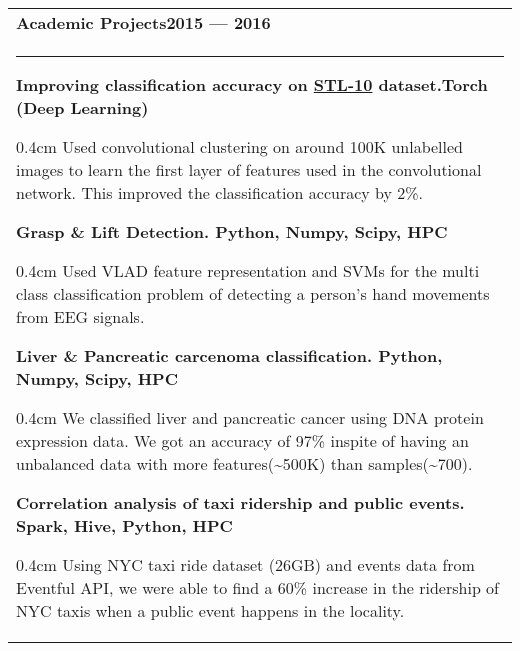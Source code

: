 \documentclass{article}
\newenvironment{projectdescription}{\begin{adjustwidth}{0.4cm}{}}{\end{adjustwidth}}
\begin{document}
\bigskip

\begin{tabular}{p{\dimexpr\linewidth-2\tabcolsep}}
	\bfseries \large{Academic Projects}\hfill 2015 --- 2016 \mdseries \\
	\noindent\rule{\textwidth}{0.4pt}
	\bfseries Improving classification accuracy on \href{http://cs.stanford.edu/~acoates/stl10/}{STL-10} dataset.\mdseries \hfill Torch (Deep Learning)

	\begin{projectdescription}
	Used convolutional clustering on around 100K unlabelled images to learn the first layer of features used in the convolutional network.  
	This improved the classification accuracy by 2\%.
	\end{projectdescription}
	\smallskip

	\bfseries Grasp \& Lift Detection. \mdseries \hfill Python, Numpy, Scipy, HPC 
	\begin{projectdescription}
	Used VLAD feature representation and SVMs for the multi class classification problem of detecting a person's hand movements from EEG signals.
	\end{projectdescription}
	\smallskip
	\bfseries Liver \& Pancreatic carcenoma classification.  \mdseries\hfill Python, Numpy, Scipy, HPC
	\begin{projectdescription}
		We classified liver and pancreatic cancer using DNA protein expression data.  We got an accuracy of 97\% inspite of having an unbalanced data with more features(\textasciitilde500K) than samples(\textasciitilde700).
	\end{projectdescription}

	\smallskip

	\bfseries Correlation analysis of taxi ridership and public events. \mdseries \hfill Spark, Hive, Python, HPC
	\begin{projectdescription}
			Using NYC taxi ride dataset (26GB) and events data from Eventful API, we were able to find a 60\% increase in the ridership of NYC taxis when a public event happens in the locality.
	\end{projectdescription}
\end{tabular}
\bigskip
\end{document}

